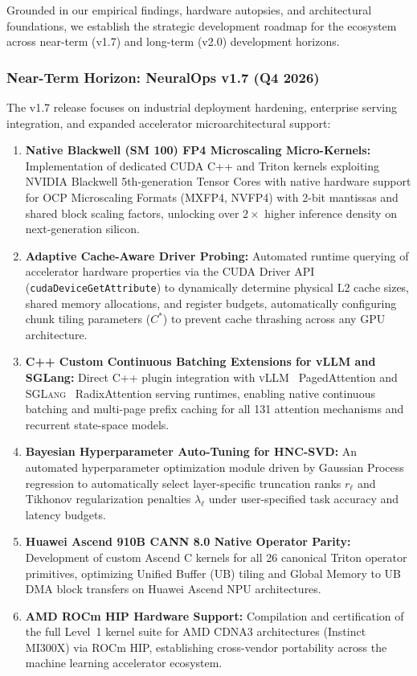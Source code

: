 Grounded in our empirical findings, hardware autopsies, and architectural foundations, we establish the strategic development roadmap for the \neuralops{} ecosystem across near-term (v1.7) and long-term (v2.0) development horizons.

\subsubsection{Near-Term Horizon: NeuralOps v1.7 (Q4 2026)}
\label{subsubsec:roadmap_v17}

The v1.7 release focuses on industrial deployment hardening, enterprise serving integration, and expanded accelerator microarchitectural support:
\begin{enumerate}
    \item \textbf{Native Blackwell (SM 100) FP4 Microscaling Micro-Kernels:}
    Implementation of dedicated CUDA C++ and Triton kernels exploiting NVIDIA Blackwell 5th-generation Tensor Cores with native hardware support for OCP Microscaling Formats (MXFP4, NVFP4) with 2-bit mantissas and shared block scaling factors, unlocking over $2\times$ higher inference density on next-generation silicon.
    \item \textbf{Adaptive Cache-Aware Driver Probing:}
    Automated runtime querying of accelerator hardware properties via the CUDA Driver API (\texttt{cudaDeviceGetAttribute}) to dynamically determine physical L2 cache sizes, shared memory allocations, and register budgets, automatically configuring chunk tiling parameters ($C^*$) to prevent cache thrashing across any GPU architecture.
    \item \textbf{C++ Custom Continuous Batching Extensions for vLLM and SGLang:}
    Direct C++ plugin integration with \textsc{vLLM}~\cite{kwon2023vllm} PagedAttention and \textsc{SGLang}~\cite{zheng2024sglang} RadixAttention serving runtimes, enabling native continuous batching and multi-page prefix caching for all 131 attention mechanisms and recurrent state-space models.
    \item \textbf{Bayesian Hyperparameter Auto-Tuning for HNC-SVD:}
    An automated hyperparameter optimization module driven by Gaussian Process regression to automatically select layer-specific truncation ranks $r_\ell$ and Tikhonov regularization penalties $\lambda_\ell$ under user-specified task accuracy and latency budgets.
    \item \textbf{Huawei Ascend 910B CANN 8.0 Native Operator Parity:}
    Development of custom Ascend C kernels for all 26 canonical Triton operator primitives, optimizing Unified Buffer (UB) tiling and Global Memory to UB DMA block transfers on Huawei Ascend NPU architectures.
    \item \textbf{AMD ROCm HIP Hardware Support:}
    Compilation and certification of the full Level~1 kernel suite for AMD CDNA3 architectures (Instinct MI300X) via ROCm HIP, establishing cross-vendor portability across the machine learning accelerator ecosystem.
\end{enumerate}

